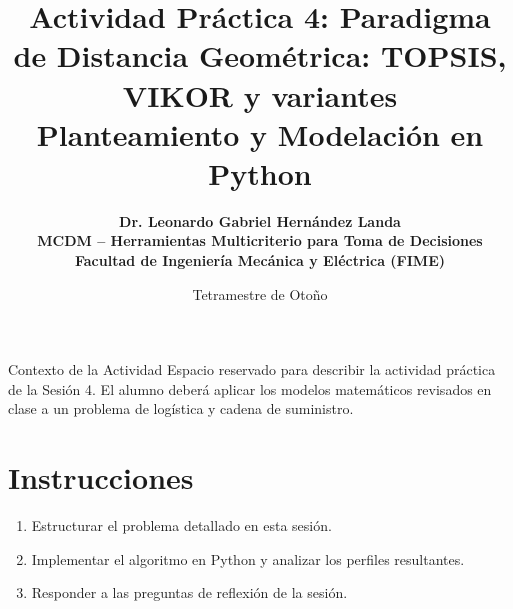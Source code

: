 \documentclass[11pt,a4paper]{article}
\title{%
  \sffamily\bfseries\color{UANLblue}%
  Actividad Práctica 4: Paradigma de Distancia Geométrica: TOPSIS, VIKOR y variantes\\
  \large Planteamiento y Modelación en Python
}
\author{%
  \sffamily\bfseries\color{FIMEdarkgray}%
  Dr. Leonardo Gabriel Hernández Landa\\
  \small MCDM -- Herramientas Multicriterio para Toma de Decisiones\\
  \small\color{FIMEgreen}Facultad de Ingeniería Mecánica y Eléctrica (FIME)
}
\date{\sffamily Tetramestre de Otoño}
\begin{document}
\maketitle
\thispagestyle{fancy}

\begin{brandbox}{Contexto de la Actividad}
  Espacio reservado para describir la actividad práctica de la Sesión 4. El alumno deberá aplicar los modelos matemáticos revisados en clase a un problema de logística y cadena de suministro.
\end{brandbox}

\section{Instrucciones}
\begin{enumerate}
    \item Estructurar el problema detallado en esta sesión.
    \item Implementar el algoritmo en Python y analizar los perfiles resultantes.
    \item Responder a las preguntas de reflexión de la sesión.
\end{enumerate}
\end{document}
